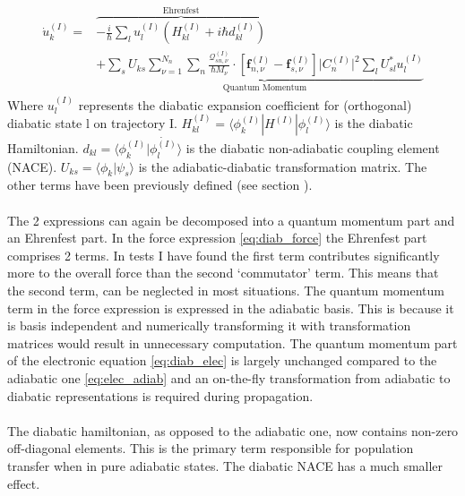 \begin{align}
\dot{u}_k^{(I)} =
&\overbrace{ - \frac{i}{\hbar}\sum\limits_{l} u_l^{(I)} \left(H_{kl}^{(I)} + i \hbar d_{kl}^{(I)} \right) }^{\text{Ehrenfest}} \\
& + \underbrace{\sum_{s} U_{ks} \sum_{\nu = 1}^{N_n} \sum_n   \frac{\mathcal{Q}_{sn,\nu}^{(I)}}{\hbar M_\nu}\cdot \left[ \mathbf{f}_{n, \nu}^{(I)}- \mathbf{f}^{(I)}_{s, \nu}\right]\vert C_n^{(I)} \vert^2 \sum_{l} U^{*}_{sl} u^{(I)}_{l}}_{\text{Quantum Momentum}}
\label{eq:diab_elec}
\end{align}
Where $u_l^{(I)}$ represents the diabatic expansion coefficient for (orthogonal) diabatic state l on trajectory I. $H_{kl}^{(I)} = \langle \phi_{k}^{(I)} | H^{(I)} | \phi_{l}^{(I)} \rangle$ is the diabatic Hamiltonian. $d_{kl} = \langle \phi_{k}^{(I)} | \dot{\phi_{l}^{(I)}} \rangle$ is the diabatic non-adiabatic coupling element (NACE). $U_{ks} = \langle \phi_{k} | \psi_{s} \rangle $
is the adiabatic-diabatic transformation matrix. The other terms have been previously defined (see section
 \label{sec:ad_eqns}).
 \\\\
 The 2 expressions can again be decomposed into a quantum momentum part and an Ehrenfest part. In the force expression \eqref{eq:diab_force} the Ehrenfest part comprises 2 terms. In tests I have found the first term  contributes significantly more to the overall force than the second `commutator' term. This means that the second term, can be neglected in most situations. The quantum momentum term in the force expression is expressed in the adiabatic basis. This is because it is basis independent and numerically transforming it with transformation matrices would result in unnecessary computation. The quantum momentum part of the electronic equation \eqref{eq:diab_elec} is largely unchanged compared to the adiabatic one \eqref{eq:elec_adiab} and an on-the-fly transformation from adiabatic to diabatic representations is required during propagation.
 \\\\
 The diabatic hamiltonian, as opposed to the adiabatic one, now contains non-zero off-diagonal elements. This is the primary term responsible for population transfer when in pure adiabatic states. The diabatic NACE has a much smaller effect.
